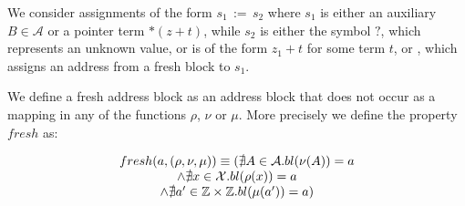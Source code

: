 We consider assignments of the form $s_1\,{:=}\,s_2$ where $s_1$ is either an auxiliary $B \in \mathcal{A}$ or a pointer term $*(z+t)$, while $s_2$ is either the symbol $?$, which represents an unknown value, or is of the form $z_1 + t$ for some term $t$, or \malloc, which assigns an address from a fresh block to $s_1$.

We define a fresh address block as an address block that does not occur as a mapping in any of the functions $\rho$, $\nu$ or $\mu$. More precisely we define the property $fresh$ as:

\[ \begin{array}{c}
		fresh(a, (\rho,\nu,\mu)) \equiv
		(\nexists A\in \mathcal{A} . bl(\nu(A)) = a     \\
		\land \nexists x\in \mathcal{X}. bl(\rho(x)) = a \\
		\land \nexists a'\in \mathbb{Z} \times \mathbb{Z} . bl(\mu(a')) = a)
	\end{array}
\]

